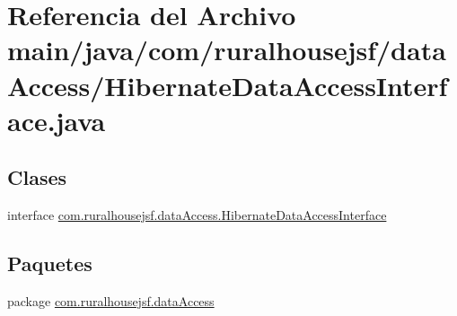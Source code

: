 \hypertarget{a00017}{}\section{Referencia del Archivo main/java/com/ruralhousejsf/data\+Access/\+Hibernate\+Data\+Access\+Interface.java}
\label{a00017}
\subsection*{Clases}
\begin{DoxyCompactItemize}
\item 
interface \mbox{\hyperlink{a00148}{com.\+ruralhousejsf.\+data\+Access.\+Hibernate\+Data\+Access\+Interface}}
\end{DoxyCompactItemize}
\subsection*{Paquetes}
\begin{DoxyCompactItemize}
\item 
package \mbox{\hyperlink{a00112}{com.\+ruralhousejsf.\+data\+Access}}
\end{DoxyCompactItemize}
